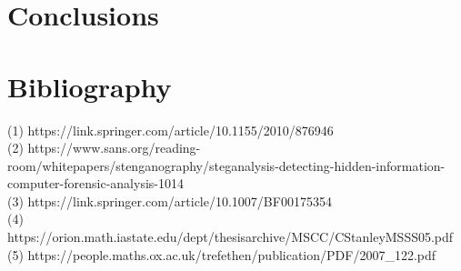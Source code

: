 \documentclass[12pt]{article}
\begin{document}
\section{Conclusions}



\section{Bibliography}
(1) https://link.springer.com/article/10.1155/2010/876946 \\
(2) https://www.sans.org/reading-room/whitepapers/stenganography/steganalysis-detecting-hidden-information-computer-forensic-analysis-1014 \\
(3) https://link.springer.com/article/10.1007/BF00175354 \\
(4) https://orion.math.iastate.edu/dept/thesisarchive/MSCC/CStanleyMSSS05.pdf \\
(5) https://people.maths.ox.ac.uk/trefethen/publication/PDF/2007\_122.pdf
\end{document}
